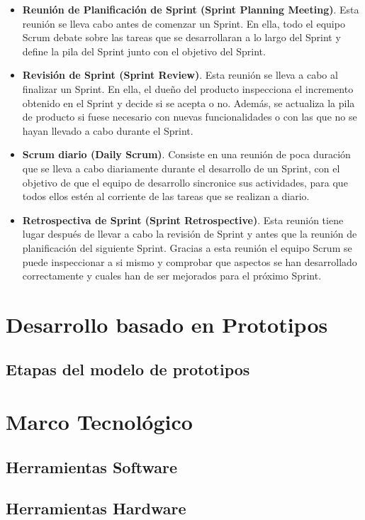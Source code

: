 \begin{itemize}
	\item \textbf{Reunión de Planificación de Sprint (Sprint Planning Meeting)}. Esta reunión se lleva cabo antes de comenzar un Sprint. En ella, todo el equipo Scrum debate sobre las tareas que se desarrollaran a lo largo del Sprint y define la pila del Sprint junto con el objetivo del Sprint.
	\item \textbf{Revisión de Sprint (Sprint Review)}. Esta reunión se lleva a cabo al finalizar un Sprint. En ella, el dueño del producto inspecciona el incremento obtenido en el Sprint y decide si se acepta o no. Además, se actualiza la pila de producto si fuese necesario con nuevas funcionalidades o con las que no se hayan llevado a cabo durante el Sprint.
	\item \textbf{Scrum diario (Daily Scrum)}. Consiste en una reunión de poca duración que se lleva a cabo diariamente durante el desarrollo de un Sprint, con el objetivo de que el equipo de desarrollo sincronice sus actividades, para que todos ellos estén al corriente de las tareas que se realizan a diario.
	\item \textbf{Retrospectiva de Sprint (Sprint Retrospective)}. Esta reunión tiene lugar después de llevar a cabo la revisión de Sprint y antes que la reunión de planificación del siguiente Sprint. Gracias a esta reunión el equipo Scrum se puede inspeccionar a si mismo y comprobar que aspectos se han desarrollado correctamente y cuales han de ser mejorados para el próximo Sprint.
\end{itemize}
\section{Desarrollo basado en Prototipos}
\label{sec:Prototipos}

\subsection{Etapas del modelo de prototipos}
\label{sec:EtapasPrototipos}

\section{Marco Tecnológico}
\label{sec:MarcoTecnologico}

\subsection{Herramientas Software}
\label{sec:HerramientasSoftware}

\subsection{Herramientas Hardware}
\label{sec:HerramientasHardware}